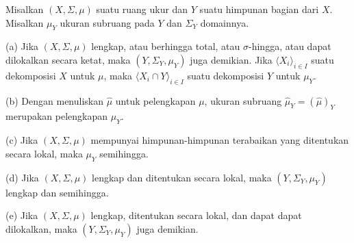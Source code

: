  Misalkan $(X,\Sigma,\mu)$ suatu ruang ukur dan
$Y$ suatu himpunan bagian dari $X$.   Misalkan $\mu_Y$ ukuran subruang
pada $Y$ dan $\Sigma_Y$ domainnya.

(a) Jika $(X,\Sigma,\mu)$ lengkap, atau berhingga total, atau
$\sigma$-hingga, atau dapat dilokalkan secara ketat, maka
$(Y,\Sigma_Y,\mu_Y)$ juga demikian. Jika
$\langle X_i\rangle_{i\in I}$ suatu dekomposisi $X$ untuk $\mu$, maka
$\langle X_i\cap Y\rangle_{i\in I}$ suatu dekomposisi $Y$ untuk $\mu_Y$.

(b) Dengan menuliskan $\hat\mu$ untuk pelengkapan $\mu$, ukuran subruang
$\hat\mu_Y=(\hat\mu)_Y$ merupakan pelengkapan $\mu_Y$.

(c) Jika $(X,\Sigma,\mu)$ mempunyai himpunan-himpunan terabaikan yang
ditentukan secara lokal, maka $\mu_Y$ semihingga.

(d) Jika $(X,\Sigma,\mu)$ lengkap dan ditentukan secara lokal, maka
$(Y,\Sigma_Y,\mu_Y)$ lengkap dan semihingga.

(e) Jika $(X,\Sigma,\mu)$ lengkap, ditentukan secara lokal, dan dapat
dapat dilokalkan, maka $(Y,\Sigma_Y,\mu_Y)$ juga demikian.

